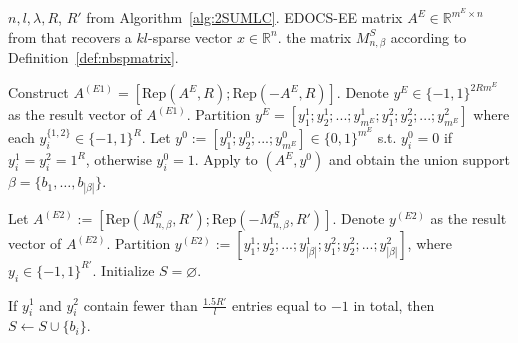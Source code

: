\documentclass[10pt,a4paper]{amsart}
\begin{document}
\begin{algorithm}
\caption{Multi-stage scheme of the MLC under Assumption~\ref{Assumption1}: Overall description}\label{alg:MSPMLC}
\begin{algorithmic}[1]
    \Require $n,l,\lambda,R$, $R'$ from Algorithm~\ref{alg:2SUMLC}. EDOCS-EE matrix $A^E\in \mathbb{R}^{m^E\times n}$ from \cite[Algorithm~4]{li2025support} that recovers a $kl$-sparse vector $x\in \mathbb{R}^n$. the matrix $M_{n,\beta}^S$ according to Definition~\ref{def:nbspmatrix}.
    
    \State Construct
    \(
    A^{(E1)}=[\mathrm{Rep}(A^E,R);\mathrm{Rep}(-A^E,R)]
    \). Denote $y^E\in\{-1,1\}^{2Rm^E}$ as the result vector of $A^{(E1)}$. Partition $y^E=[y_1^1;y_2^1;...;y_{m^E}^1;y_1^2;y_2^2;...;y_{m^E}^2]$ where each $y_i^{\{1,2\}}\in \{-1,1\}^R$. Let $y^0:=[y_1^0;y_2^0;...;y_{m^E}^0]\in\{0,1\}^{m^E}$ s.t. $y_i^0=0$ if $y_i^1=y_i^2=1^R$, otherwise $y_i^0=1$.
    \State Apply \cite[Algorithm~5]{li2025support} to $(A^E,y^0)$ and obtain the union support
$\beta=\{b_1,\ldots,b_{|\beta|}\}$. \begin{scriptsize}
        
    \end{scriptsize} 
    \State Let $A^{(E2)}:=[\mathrm{Rep}(M_{n,\beta}^S,R');\mathrm{Rep}(-M_{n,\beta}^S,R')]$. Denote $y^{(E2)}$ as the result vector of $A^{(E2)}$. Partition $y^{(E2)}:=[y_1^1;y_2^1;...;y_{|\beta|}^1;y_1^2;y_2^2;...;y_{|\beta|}^2]$, where $y_i\in\{-1,1\}^{R'}$. Initialize $S=\varnothing$. 
    \begin{scriptsize}
    \end{scriptsize}
    \State If $y_i^1$ and $y_i^2$ contain fewer than $\frac{1.5R'}{l}$ entries equal to $-1$ in total, then $S\leftarrow S\cup\{b_i\}$. 
    \EndFor
    

\end{algorithmic}
\end{algorithm}
\end{document}
